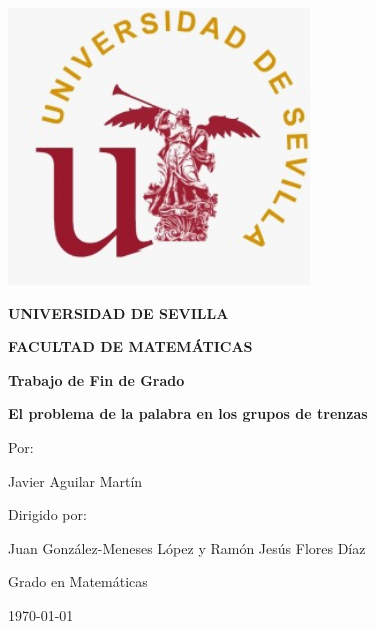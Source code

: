 \documentclass[twoside,12pt]{report}
\begin{document}
\begin{titlepage}
	\centering
		\includegraphics[width=8cm]{Imagenes/sello.jpeg}
		
	{\Large\bfseries UNIVERSIDAD DE SEVILLA\par}
	{\Large\bfseries FACULTAD DE MATEMÁTICAS\par}
	\vspace{0.5cm}
	{\large\bfseries Trabajo de Fin de Grado \par}
	\vspace{1cm}
	{\Huge\bfseries El problema de la palabra en los grupos de trenzas\par}
	\vspace{1cm}
	{\large Por:\par}
	{\large Javier Aguilar Martín\par}
	\vspace{0.5cm}
	{\large Dirigido por:\par}
	{\large Juan González-Meneses López y Ramón Jesús Flores Díaz\par}
	\vspace{1cm}
	{\large Grado en Matemáticas\par}
	\vspace{0.5cm}
	{\large \today\par}
	\vspace{1cm}





	
\end{titlepage}



\tableofcontents










\end{document}
